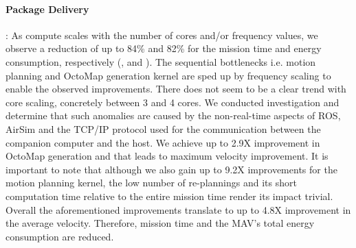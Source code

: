  


\paragraph{Package Delivery}:  As compute scales with the number of cores and/or frequency values, we observe a reduction of up to 84\% and 82\% for the mission time and energy consumption, respectively (, and ). The sequential bottlenecks i.e. motion planning and OctoMap generation kernel are sped up by frequency scaling to enable the observed improvements. There does not seem to be a clear trend with core scaling, concretely between 3 and 4 cores. We conducted investigation and determine that such anomalies are caused by the non-real-time aspects of ROS, AirSim and the TCP/IP protocol used for the communication between the companion computer and the host. We achieve up to 2.9X improvement in OctoMap generation and that leads to maximum velocity improvement. It is important to note that although we also gain up to 9.2X improvements for the motion planning kernel, the low number of re-plannings and its short computation time relative to the entire mission time render its impact trivial. Overall the aforementioned improvements translate to up to 4.8X improvement in the average velocity. Therefore, mission time and the MAV's total energy consumption are reduced.


 
